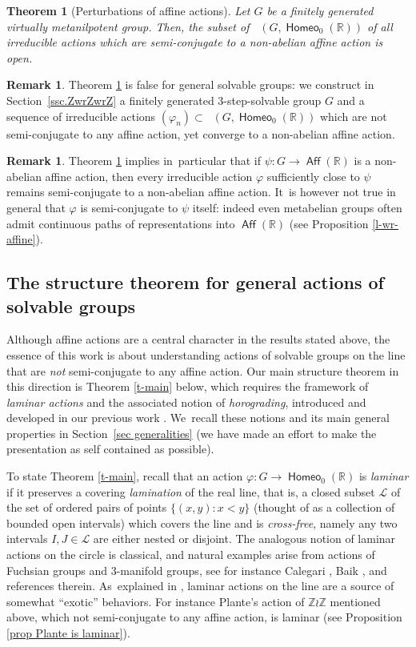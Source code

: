 \documentclass[JEP,XML,SOM,Unicode,NoFloatCountersInSection,published]{cedram}
\newtheorem{introthm}{Theorem}
\theoremstyle{definition}
\newtheorem{rem}[thm]{Remark}
\DeclareMathOperator{\Aff}{\mathsf{Aff}}
\DeclareMathOperator{\homeo}{\mathsf{Homeo}}
\DeclareMathOperator{\Homirr}{\mathsf{Hom}_{\mathrm{irr}}}
\newcommand{\R}{\mathbb{R}}
\newcommand{\Z}{\mathbb Z}
\newcommand{\Lcal}{\mathcal{L}}
\begin{document}
\begin{introthm}[Perturbations of affine actions]\label{mthm.affine_rigid}
Let $G$ be a finitely generated virtually metanilpotent group.
Then, the subset of $\Homirr(G, \homeo_0(\R))$ of all irreducible actions which are semi-conjugate to a non-abelian affine action is open.
\end{introthm}

\begin{rem} Theorem \ref{mthm.affine_rigid} is false for general solvable groups: we construct
in Section~\ref{ssc.ZwrZwrZ} a finitely generated 3-step-solvable group $G$ and a sequence of irreducible actions $(\varphi_n)\subset \Homirr(G, \homeo_0(\R))$ which are not semi-conjugate to any affine action, yet converge to a non-abelian affine action.
\end{rem}
\begin{rem}
Theorem \ref{mthm.affine_rigid} implies in~particular that if $\psi\colon G\to \Aff(\R)$ is a non-abelian affine action, then every irreducible action $\varphi$ sufficiently close to $\psi$ remains semi-conjugate to a non-abelian affine action. It~is however not true in general that ${\varphi}$ is semi-conjugate to $\psi$ itself:
indeed even metabelian groups often admit continuous paths of representations into $\Aff(\R)$ (see \eg Proposition \ref{l-wr-affine}).
\end{rem}

\subsection{The structure theorem for general actions of solvable groups}

Although affine actions are a central character in the results stated above, the essence of this work is about understanding actions of solvable groups on the line that are \emph{not} semi-conjugate to any affine action. Our main structure theorem in this direction is Theorem \ref{t-main} below, which requires the framework of \emph{laminar actions} and the associated notion of \emph{horograding}, introduced and developed in our previous work \cite{BMRT}. We~recall these notions and its main general properties in Section~\ref{sec generalities} (we have made an effort to make the presentation as self contained as possible).

To state Theorem \ref{t-main}, recall that an action $\varphi\colon G\to \homeo_0(\R)$ is {\em laminar} if it preserves a covering \emph{lamination} of the real line, that is, a closed subset $\Lcal$ of the set of ordered pairs of points $\{(x, y) : x<y\}$ (thought of as a collection of bounded open intervals) which covers the line and is \emph{cross-free}, namely any two intervals $I, J\in \Lcal$ are either nested or disjoint. The analogous notion of laminar actions on the circle is classical, and natural examples arise from actions of Fuchsian groups and 3-manifold groups, see for instance Calegari \cite{Calegaribook}, Baik \cite{LaminarBaik}, and references therein. As~explained in \cite{BMRT}, laminar actions on the line are a source of somewhat ``exotic'' behaviors. For instance Plante's action of $\Z\wr\Z$ mentioned above, which not semi-conjugate to any affine action, is laminar (see Proposition \ref{prop Plante is laminar}).
\end{document}
